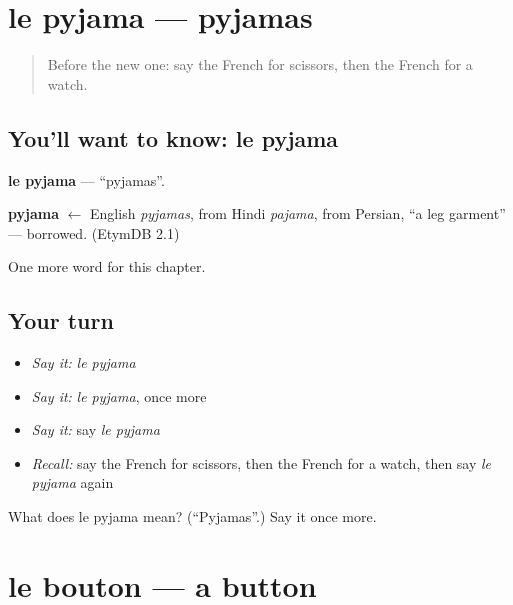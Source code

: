 \section[le pyjama]{le pyjama — pyjamas}

\label{lesson:FR-C221-pyjama}



\begin{quote}
Before the new one: say the French for scissors, then the French for a watch.
\end{quote}

\subsection*{You'll want to know: le pyjama}
\textbf{le pyjama} — \textquotedblleft{}pyjamas\textquotedblright{}.

\begin{cousinweb}
\textbf{pyjama} $\leftarrow$ English \emph{pyjamas}, from Hindi \emph{pajama}, from Persian, \textquotedblleft{}a leg garment\textquotedblright{} — borrowed. (EtymDB 2.1)
\end{cousinweb}

\begin{grammarlens}[title={What you've built}]
One more word for this chapter.
\end{grammarlens}

\subsection*{Your turn}
\begin{itemize}
\raggedright
  \item \emph{Say it:} \emph{le pyjama}
  \item \emph{Say it:} \emph{le pyjama}, once more
  \item \emph{Say it:} say \emph{le pyjama}
  \item \emph{Recall:} say the French for scissors, then the French for a watch, then say \emph{le pyjama} again
\end{itemize}

\begin{tcolorbox}[breakable,colback=teal!4,colframe=teal!35!black,title={Before you move on}]
What does le pyjama mean? (\textquotedblleft{}Pyjamas\textquotedblright{}.) Say it once more.
\end{tcolorbox}
\section[le bouton]{le bouton — a button}

